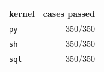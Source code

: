 \begin{tabular}{lr}
\toprule
kernel & cases passed \\
\midrule
\texttt{py} & 350/350 \\
\texttt{sh} & 350/350 \\
\texttt{sql} & 350/350 \\
\bottomrule
\end{tabular}
